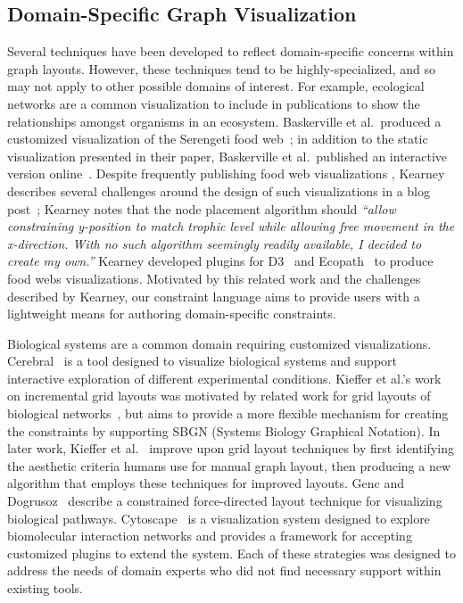 \subsection{Domain-Specific Graph Visualization}
Several techniques have been developed to reflect domain-specific concerns
within graph layouts. However, these techniques
tend to be highly-specialized, and so may not apply to other possible
domains of interest. For example, ecological networks are a common visualization
to include in publications to show the relationships amongst organisms in
an ecosystem. Baskerville et al.\ produced a customized visualization of 
the Serengeti food web~\cite{baskerville2011spatial};  in addition to the 
static visualization presented in their paper, Baskerville et al.\ 
published an interactive version online~\cite{baskerville2011interactive}. 
Despite frequently publishing food web visualizations \cite{kearney2012coupling,kearney2013amplification},
Kearney describes several challenges around the design of such visualizations
in a blog post~\cite{kearney2016blog}; Kearney notes that the node
placement algorithm should \emph{``allow constraining y-position to match
  trophic level while allowing free movement in the x-direction. With no
  such algorithm seemingly readily available, I decided to create my
  own.''} Kearney developed plugins for D3~\cite{kearney2017d3} and
Ecopath~\cite{kearney2017ecopath} to produce food webs visualizations. 
Motivated by this related work and the
challenges described by Kearney, our constraint language aims to provide users
with a lightweight means for authoring domain-specific constraints.

Biological systems are a common domain requiring customized visualizations.
Cerebral~\cite{barsky2008cerebral} is a tool designed to visualize
biological systems and support interactive exploration of different
experimental conditions. Kieffer et al.'s work on incremental grid layouts 
was motivated by related work  for grid layouts of biological 
networks~\cite{barsky2008cerebral,kojima2007efficient,li2005grid}, 
but aims to provide a more flexible mechanism for creating the constraints 
by supporting SBGN (Systems Biology Graphical Notation). In later
work, Kieffer et al.~\cite{kieffer2016hola} improve upon grid layout techniques
by first identifying the aesthetic criteria humans use for manual graph layout,
then producing a new algorithm that employs these techniques for improved layouts.
Genc and Dogrusoz~\cite{genc2003constrained}
describe a constrained force-directed layout technique for visualizing 
biological pathways. Cytoscape~\cite{shannon2003cytoscape} is a
visualization system designed to explore biomolecular interaction networks
and provides a framework for accepting customized plugins to extend the
system. Each of these strategies was designed to
address the needs of domain experts who did not find necessary
support within existing tools.

